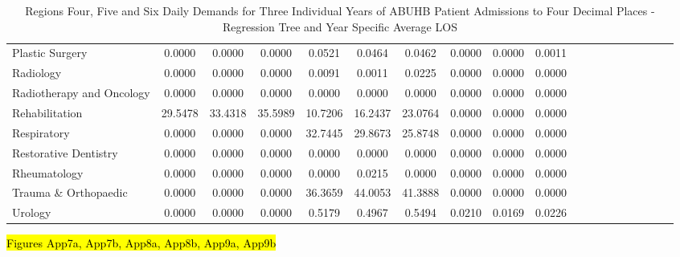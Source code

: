 \documentclass[thesis.tex]{subfiles}
\begin{document}
\begin{landscape}
\begin{table}[h!]
{\begin{tabular}{lcccccccccccccccccc}
Plastic Surgery	&0.0000&	0.0000&	0.0000&	0.0521&	0.0464&	0.0462&	0.0000&	0.0000&	0.0011\\
Radiology&	0.0000&	0.0000&	0.0000&	0.0091&	0.0011&	0.0225&	0.0000&	0.0000&	0.0000\\
Radiotherapy and Oncology&	0.0000&	0.0000&	0.0000&	0.0000&	0.0000&	0.0000&	0.0000&	0.0000&	0.0000\\
Rehabilitation&	29.5478&	33.4318&	35.5989&	10.7206&	16.2437&	23.0764&	0.0000&	0.0000&	0.0000\\
Respiratory&	0.0000&	0.0000&	0.0000&	32.7445&	29.8673&	25.8748&	0.0000&	0.0000&	0.0000\\
Restorative Dentistry	&0.0000&	0.0000&	0.0000&	0.0000&	0.0000&	0.0000&	0.0000&	0.0000&	0.0000\\
Rheumatology&	0.0000&	0.0000&	0.0000&	0.0000&	0.0215&	0.0000&	0.0000&	0.0000&	0.0000\\
Trauma \& Orthopaedic&	0.0000&	0.0000&	0.0000&	36.3659&	44.0053&	41.3888&	0.0000&	0.0000&	0.0000\\
Urology&	0.0000&	0.0000&	0.0000&	0.5179&	0.4967&	0.5494&	0.0210&	0.0169&	0.0226\\


\bottomrule


\end{tabular}  } 
\caption{Regions Four, Five and Six Daily Demands for Three Individual Years of ABUHB Patient Admissions to Four Decimal Places - Regression Tree and Year Specific Average LOS}
    \label{apptab:LinkedDemands3b}
\end{table}
\end{landscape}

\hl{Figures App7a, App7b, App8a, App8b, App9a, App9b}
\end{document}
